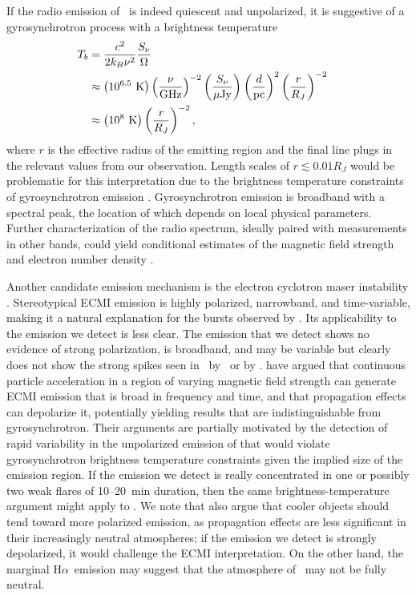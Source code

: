 \documentclass[iop]{emulateapj}
\newcommand\citeeg[1]{\citep[e.g.,][]{#1}}
\newcommand\ujy{\ensuremath{\mu\text{Jy}}}
\newcommand\vtwom{2M\,1047+21} %
\newcommand\twom{\object{\vtwom}}
\newcommand\fpow[3]{\left(\frac{#1}{#2}\right)^{#3}}
\newcommand\ha{H$\alpha$}
\begin{document}
If the radio emission of \twom\ is indeed quiescent and unpolarized, it is
\WEBTEXtraceon
suggestive of a gyrosynchrotron process with a brightness temperature
\begin{align}
T_b &= \frac{c^2}{2 k_B \nu^2} \frac{S_\nu}{\Omega} \cr
 &\approx \left(10^{6.5}\text{ K}\right) \fpow{\nu}{\text{GHz}}{-2}
   \fpow{S_\nu}{\ujy}{} \fpow{d}{\text{pc}}{2} \fpow{r}{R_J}{-2} \cr
 &\approx \left(10^8\text{ K}\right) \fpow{r}{R_J}{-2},
\end{align}
where $r$ is the effective radius of the emitting region and the final line
plugs in the relevant values from our observation. Length scales of $r
\lesssim 0.01 R_J$ would be problematic for this interpretation due to the
brightness temperature constraints of gyrosynchrotron emission \citep{d85}.
Gyrosynchrotron emission is broadband with a spectral peak, the location of
which depends on local physical parameters. Further characterization of the
radio spectrum, ideally paired with measurements in other bands, could yield
conditional estimates of the magnetic field strength and electron number
density \citeeg{b06b}.

Another candidate emission mechanism is the electron cyclotron maser
instability \citep[ECMI;][]{theecm,t06}. Stereotypical ECMI emission is highly
polarized, narrowband, and time-variable, making it a natural explanation for
the bursts observed by \rw. Its applicability to the emission we detect is
less clear. The emission that we detect shows no evidence of strong
polarization, is broadband, and may be variable but clearly does not show the
strong spikes seen in \twom\ by \rw\ or  by
\citet{brpb+09}. \citet{had+06,had+08} have argued that continuous particle
acceleration in a region of varying magnetic field strength can generate ECMI
emission that is broad in frequency and time, and that propagation effects can
depolarize it, potentially yielding results that are indistinguishable from
gyrosynchrotron. Their arguments are partially motivated by the detection of
rapid variability in the unpolarized emission of  that would violate gyrosynchrotron brightness temperature
constraints given the implied size of the emission region. If the emission we
detect is really concentrated in one or possibly two weak flares of 10--20~min
duration, then the same brightness-temperature argument might apply to \twom.
We note that \citet{had+08} also argue that cooler objects should tend toward
more polarized emission, as propagation effects are less significant in their
increasingly neutral atmospheres; if the emission we detect is strongly
depolarized, it would challenge the ECMI interpretation. On the other hand,
the marginal \ha\ emission \citep{bklb03} may suggest that the atmosphere of
\twom\ may not be fully neutral.
\end{document}
